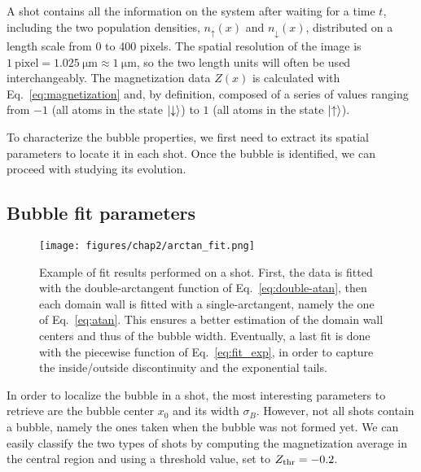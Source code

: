 A shot contains all the information on the system after waiting for a time $t$, including the two population densities, $n_\uparrow(x)$ and $n_\downarrow(x)$, distributed on a length scale from 0 to 400 pixels. The spatial resolution of the image is $1\ \text{pixel} = 1.025\ \unit{\micro\meter} \approx 1\ \unit{\micro\meter}$, so the two length units will often be used interchangeably. The magnetization data $Z(x)$ is calculated with Eq.\ \eqref{eq:magnetization} and, by definition, composed of a series of values ranging from $-1$ (all atoms in the state $\ket{\downarrow}$) to $1$ (all atoms in the state $\ket{\uparrow}$).

To characterize the bubble properties, we first need to extract its spatial parameters to locate it in each shot. Once the bubble is identified, we can proceed with studying its evolution.

\subsection{Bubble fit parameters}
\begin{figure}[ht!]
    \centering
    \texttt{[image: figures/chap2/arctan\_fit.png]}
    \caption{Example of fit results performed on a shot. First, the data is fitted with the double-arctangent function of Eq.\ \eqref{eq:double-atan}, then each domain wall is fitted with a single-arctangent, namely the one of Eq.\ \eqref{eq:atan}. This ensures a better estimation of the domain wall centers and thus of the bubble width. Eventually, a last fit is done with the piecewise function of Eq.\ \eqref{eq:fit_exp}, in order to capture the inside/outside discontinuity and the exponential tails.}
    \label{fig:atan-fit}
\end{figure}
In order to localize the bubble in a shot, the most interesting parameters to retrieve are the bubble center $x_0$ and its width $\sigma_B$.
However, not all shots contain a bubble, namely the ones taken when the bubble was not formed yet. We can easily classify the two types of shots by computing the magnetization average in the central region and using a threshold value, set to $Z_{\rm thr} = -0.2$. 

